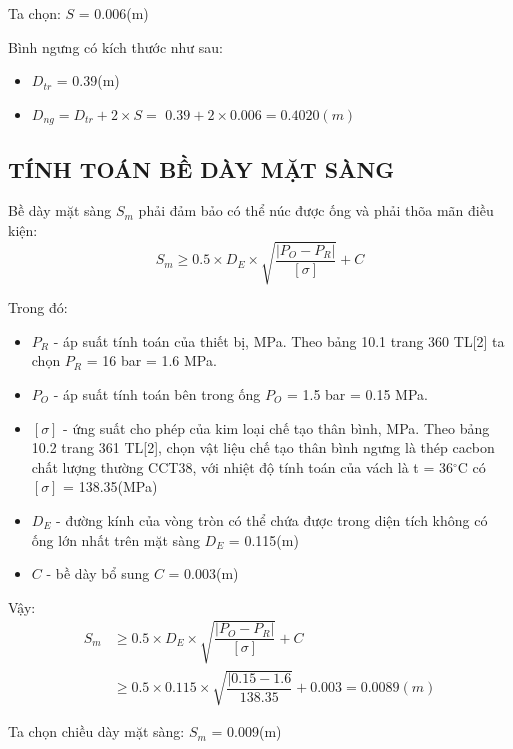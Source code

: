 Ta chọn: $S$ = 0.006(m)

Bình ngưng có kích thước như sau:
\begin{itemize}[label={$\diamond$}]
	\item $D_{tr}$ = 0.39(m)
	\item $D_{ng} = D_{tr} + 2\times S =$ $0.39 + 2 \times 0.006 = 0.4020(m)$
	      
\end{itemize}

\subsection{TÍNH TOÁN BỀ DÀY MẶT SÀNG}
Bề dày mặt sàng $S_{m}$ phải đảm bảo có thể núc được ống và phải thõa mãn điều kiện:
\begin{equation*}
	S_{m} \geq 0.5\times D_{E}\times \sqrt{\dfrac{|P_{O} - P_{R}|}{[\sigma]}} + C
\end{equation*}

Trong đó:
\begin{itemize}
	\item $P_{R}$ - áp suất tính toán của thiết bị, MPa. Theo bảng 10.1 trang 360 TL[2] ta chọn $P_{R}$ = 16 bar = 1.6  MPa.
	\item $P_{O}$ - áp suất tính toán bên trong ống $P_{O}$ = 1.5 bar = 0.15 MPa.
	\item $[\sigma]$ - ứng suất cho phép của kim loại chế tạo thân bình, MPa. Theo bảng 10.2 trang 361 TL[2], chọn vật liệu chế tạo thân bình ngưng là thép cacbon chất lượng thường CCT38, với nhiệt độ tính toán của vách là t = 36$^{\circ}$C có $[\sigma]$ = 138.35(MPa)	
	\item $D_{E}$ - đường kính của vòng tròn có thể chứa được trong diện tích không có ống lớn nhất trên mặt sàng $D_{E}$ = 0.115(m)
	\item $C$ - bề dày bổ sung $C$ = 0.003(m)
\end{itemize}

Vậy:
\begin{equation*}
\begin{split}
		S_{m} &\geq 0.5\times D_{E}\times \sqrt{\dfrac{|P_{O} - P_{R}|}{[\sigma]}} + C\\
		&\geq 0.5 \times 0.115 \times \sqrt{\dfrac{|0.15-1.6}{138.35}} + 0.003 = 0.0089(m)
\end{split}
\end{equation*}

Ta chọn chiều dày mặt sàng: $S_{m}$ = 0.009(m)

